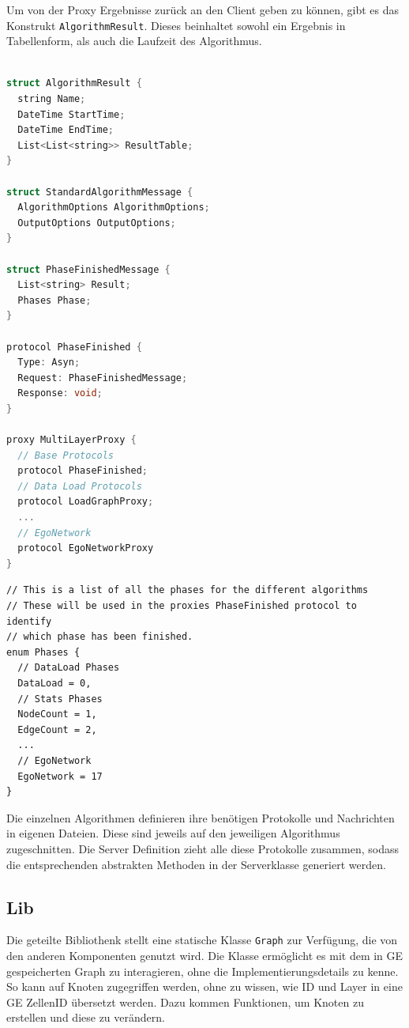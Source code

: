 Um von der Proxy Ergebnisse zurück an den Client geben zu können, gibt es das Konstrukt \verb|AlgorithmResult|. Dieses beinhaltet sowohl ein Ergebnis in Tabellenform, als auch die Laufzeit des Algorithmus.


\begin{lstlisting}[language=c, caption={Definition für die Proxy Protokolle.}]

struct AlgorithmResult {
  string Name;
  DateTime StartTime;
  DateTime EndTime;
  List<List<string>> ResultTable;
}

struct StandardAlgorithmMessage {
  AlgorithmOptions AlgorithmOptions;
  OutputOptions OutputOptions;
}

struct PhaseFinishedMessage {
  List<string> Result;
  Phases Phase;
}

protocol PhaseFinished {
  Type: Asyn;
  Request: PhaseFinishedMessage;
  Response: void;
}

proxy MultiLayerProxy {
  // Base Protocols
  protocol PhaseFinished;
  // Data Load Protocols
  protocol LoadGraphProxy;
  ...
  // EgoNetwork
  protocol EgoNetworkProxy
}
\end{lstlisting}


\begin{lstlisting}
// This is a list of all the phases for the different algorithms
// These will be used in the proxies PhaseFinished protocol to identify
// which phase has been finished.
enum Phases {
  // DataLoad Phases
  DataLoad = 0,
  // Stats Phases
  NodeCount = 1,
  EdgeCount = 2,
  ...
  // EgoNetwork
  EgoNetwork = 17
}
\end{lstlisting}


Die einzelnen Algorithmen definieren ihre benötigen Protokolle und Nachrichten in eigenen Dateien. Diese sind jeweils auf den jeweiligen Algorithmus zugeschnitten.
Die Server Definition zieht alle diese Protokolle zusammen, sodass die entsprechenden abstrakten Methoden in der Serverklasse generiert werden.

\subsection{Lib}


Die geteilte Bibliothenk stellt eine statische Klasse \verb|Graph| zur Verfügung, die von den anderen Komponenten genutzt wird. Die Klasse ermöglicht es mit dem in GE gespeicherten Graph zu interagieren, ohne die Implementierungsdetails zu kenne. So kann auf Knoten zugegriffen werden, ohne zu wissen, wie ID und Layer in eine GE ZellenID übersetzt werden. 
Dazu kommen Funktionen, um Knoten zu erstellen und diese zu verändern.

